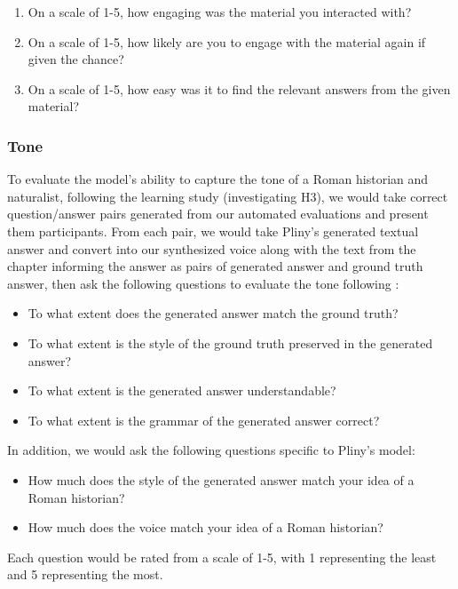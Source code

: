 \documentclass[sigconf]{aamas}
\begin{document}
\begin{enumerate}
    \item On a scale of 1-5, how engaging was the material you interacted with?
    \item On a scale of 1-5, how likely are you to engage with the material again if given the chance?
    \item On a scale of 1-5, how easy was it to find the relevant answers from the given material?
\end{enumerate}

\subsubsection{Tone}

To evaluate the model's ability to capture the tone of a Roman historian and naturalist, following the learning study (investigating H3), we would take correct question/answer pairs generated from our automated evaluations and present them participants. From each pair, we would take Pliny's generated textual answer and convert into our synthesized voice along with the text from the chapter informing the answer as pairs of generated answer and ground truth answer, then ask the following questions to evaluate the tone following \cite{10.1145/3581641.3584065}:

\begin{itemize}
    \item To what extent does the generated answer match the ground truth?
    \item To what extent is the style of the ground truth preserved in the generated answer?
    \item To what extent is the generated answer understandable?
    \item To what extent is the grammar of the generated answer correct?
\end{itemize}

In addition, we would ask the following questions specific to Pliny's model:

\begin{itemize}
    \item How much does the style of the generated answer match your idea of a Roman historian?
    \item How much does the voice match your idea of a Roman historian?
\end{itemize}

Each question would be rated from a scale of 1-5, with 1 representing the least and 5 representing the most.
\end{document}

